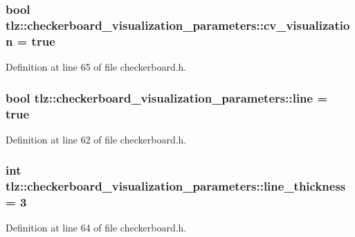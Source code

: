 \subsubsection[{\texorpdfstring{cv\+\_\+visualization}{cv_visualization}}]{\setlength{\rightskip}{0pt plus 5cm}bool tlz\+::checkerboard\+\_\+visualization\+\_\+parameters\+::cv\+\_\+visualization = true}\hypertarget{structtlz_1_1checkerboard__visualization__parameters_ac1ed8e800153fc2f33391af0b005ed54}{}\label{structtlz_1_1checkerboard__visualization__parameters_ac1ed8e800153fc2f33391af0b005ed54}


Definition at line 65 of file checkerboard.\+h.

\subsubsection[{\texorpdfstring{line}{line}}]{\setlength{\rightskip}{0pt plus 5cm}bool tlz\+::checkerboard\+\_\+visualization\+\_\+parameters\+::line = true}\hypertarget{structtlz_1_1checkerboard__visualization__parameters_a6c3b88a31a989b45bb2c05e3aa8663f6}{}\label{structtlz_1_1checkerboard__visualization__parameters_a6c3b88a31a989b45bb2c05e3aa8663f6}


Definition at line 62 of file checkerboard.\+h.

\subsubsection[{\texorpdfstring{line\+\_\+thickness}{line_thickness}}]{\setlength{\rightskip}{0pt plus 5cm}int tlz\+::checkerboard\+\_\+visualization\+\_\+parameters\+::line\+\_\+thickness = 3}\hypertarget{structtlz_1_1checkerboard__visualization__parameters_aed36c2d7efc9d049014a9036ca36886f}{}\label{structtlz_1_1checkerboard__visualization__parameters_aed36c2d7efc9d049014a9036ca36886f}


Definition at line 64 of file checkerboard.\+h.

